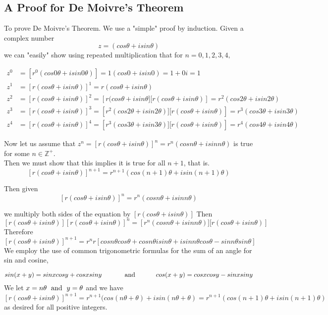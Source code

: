 \documentclass{turabian-researchpaper}
\begin{document}
\subsection{A Proof for De Moivre's Theorem}\cite[p.$\Tilde{16-17}$]{schneider2011moivre} 

To prove De Moivre's Theorem. We use a "simple" proof by induction. Given a complex number \[z = (cos\theta + isin\theta)\] we can "easily" show using repeated multiplication that for $n = 0,1,2,3,4,$ 

\begin{align*}
    z^0 &= \left[r^0(cos0\theta + isin0\theta)\right] = 1(cos0 + isin0) = 1 + 0i = 1 \\ 
    z^1 &= \left[r(cos\theta + isin\theta)\right]^1 = r(cos\theta + isin\theta) \\ 
    z^2 &= \left[r(cos\theta + isin\theta)\right]^2 = \left[r(cos\theta + isin\theta][r(cos\theta + isin\theta)\right] = r^2(cos2\theta + isin2\theta) \\ 
    z^3 &= \left[r(cos\theta + isin\theta)\right]^3 = \left[r^2(cos2\theta + isin2\theta)][r(cos\theta + isin\theta)\right] = r^3(cos3\theta + isin3\theta) \\ 
    z^4 &= \left[r(cos\theta + isin\theta)\right]^4 = \left[r^3(cos3\theta + isin3\theta)][r(cos\theta + isin\theta)\right] = r^4(cos4\theta + isin4\theta) 
\end{align*}  

Now let us assume that $z^n = \left[r(cos\theta + isin\theta)\right]^n = r^n(cosn\theta + isinn\theta)$ is true for some \(n \in \mathds{Z}^+\). \\ 
Then we must show that this implies it is true for all \(n + 1\), that is. \[\left[r(cos\theta + isin\theta)\right]^{n + 1} = r^{n + 1}(cos(n + 1)\theta + isin(n + 1)\theta)\]  

Then given \[\left[r(cos\theta + isin\theta)\right]^n = r^n(cosn\theta + isinn\theta)\] 

we multiply both sides of the equation by \(\left[r(cos\theta + isin\theta)\right]\) Then \[\left[r(cos\theta + isin\theta)\right]\left[r(cos\theta + isin\theta)\right]^n = \left[r^n(cosn\theta + isinn\theta)][r(cos\theta + isin\theta)\right]\] Therefore 
\[\left[r(cos\theta + isin\theta)\right]^{n + 1} = r^nr\left[cos{n\theta}cos{\theta} + cos{n\theta}isin\theta + isin{n\theta}cos\theta - sin{n\theta}sin\theta\right]\] 
We employ the use of common trigonometric formulas for the sum of an angle for sin and cosine, 

$$sin(x + y) = sinxcosy + cosxsiny \text{ \hspace{1cm} and \hspace{1cm}} cos(x + y) = cosxcosy - sinxsiny$$ We let \(x = n\theta \text{\hspace{.1cm} and \hspace{.1cm}} y = \theta\) and we have \[\left[r(cos\theta + isin\theta)\right]^{n + 1} = r^{n + 1}(cos(n\theta + \theta) + isin(n\theta + \theta) = r^{n + 1}(cos(n + 1)\theta + isin(n + 1)\theta)\] as desired for all positive integers. \\
\vspace{.1cm}
\end{document}
